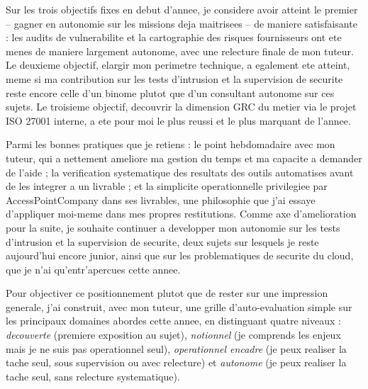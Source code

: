 \documentclass[11pt,a4paper]{article}
\begin{document}
Sur les trois objectifs fixes en debut d'annee, je considere avoir atteint le premier -- gagner en autonomie sur les missions deja maitrisees -- de maniere satisfaisante : les audits de vulnerabilite et la cartographie des risques fournisseurs ont ete menes de maniere largement autonome, avec une relecture finale de mon tuteur. Le deuxieme objectif, elargir mon perimetre technique, a egalement ete atteint, meme si ma contribution sur les tests d'intrusion et la supervision de securite reste encore celle d'un binome plutot que d'un consultant autonome sur ces sujets. Le troisieme objectif, decouvrir la dimension GRC du metier via le projet ISO 27001 interne, a ete pour moi le plus reussi et le plus marquant de l'annee.

Parmi les bonnes pratiques que je retiens : le point hebdomadaire avec mon tuteur, qui a nettement ameliore ma gestion du temps et ma capacite a demander de l'aide ; la verification systematique des resultats des outils automatises avant de les integrer a un livrable ; et la simplicite operationnelle privilegiee par AccessPointCompany dans ses livrables, une philosophie que j'ai essaye d'appliquer moi-meme dans mes propres restitutions. Comme axe d'amelioration pour la suite, je souhaite continuer a developper mon autonomie sur les tests d'intrusion et la supervision de securite, deux sujets sur lesquels je reste aujourd'hui encore junior, ainsi que sur les problematiques de securite du cloud, que je n'ai qu'entr'apercues cette annee.

Pour objectiver ce positionnement plutot que de rester sur une impression generale, j'ai construit, avec mon tuteur, une grille d'auto-evaluation simple sur les principaux domaines abordes cette annee, en distinguant quatre niveaux : \emph{decouverte} (premiere exposition au sujet), \emph{notionnel} (je comprends les enjeux mais je ne suis pas operationnel seul), \emph{operationnel encadre} (je peux realiser la tache seul, sous supervision ou avec relecture) et \emph{autonome} (je peux realiser la tache seul, sans relecture systematique).
\end{document}
